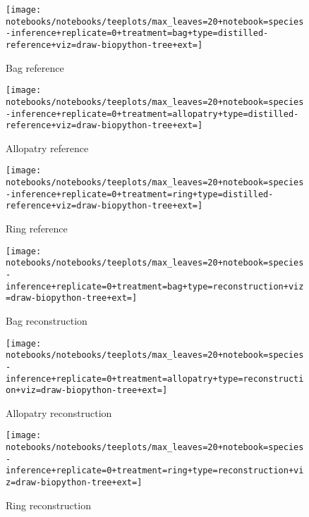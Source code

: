\begin{sidewaysfigure}

  \begin{subfigure}{.33\linewidth}
    \centering
    \texttt{[image: notebooks/notebooks/teeplots/max\_leaves=20+notebook=species-inference+replicate=0+treatment=bag+type=distilled-reference+viz=draw-biopython-tree+ext=]}
    \caption{Bag reference}
    \label{fig:species-example-replicates:bag-reference}
  \end{subfigure}
  \begin{subfigure}{.33\linewidth}
    \centering
    \texttt{[image: notebooks/notebooks/teeplots/max\_leaves=20+notebook=species-inference+replicate=0+treatment=allopatry+type=distilled-reference+viz=draw-biopython-tree+ext=]}
    \caption{Allopatry reference}
    \label{fig:species-example-replicates:allopatry-reference}
  \end{subfigure}
  \begin{subfigure}{.33\linewidth}
    \centering
    \texttt{[image: notebooks/notebooks/teeplots/max\_leaves=20+notebook=species-inference+replicate=0+treatment=ring+type=distilled-reference+viz=draw-biopython-tree+ext=]}
    \caption{Ring reference}
    \label{fig:species-example-replicates:ring-reference}
  \end{subfigure}

  \begin{subfigure}{.33\linewidth}
    \centering
    \texttt{[image: notebooks/notebooks/teeplots/max\_leaves=20+notebook=species-inference+replicate=0+treatment=bag+type=reconstruction+viz=draw-biopython-tree+ext=]}
    \caption{Bag reconstruction}
    \label{fig:species-example-replicates:bag-reconstruction}
  \end{subfigure}
  \begin{subfigure}{.33\linewidth}
    \centering
    \texttt{[image: notebooks/notebooks/teeplots/max\_leaves=20+notebook=species-inference+replicate=0+treatment=allopatry+type=reconstruction+viz=draw-biopython-tree+ext=]}
    \caption{Allopatry reconstruction}
    \label{fig:species-example-replicates:allopatry-reconstruction}
  \end{subfigure}
  \begin{subfigure}{.33\linewidth}
    \centering
    \texttt{[image: notebooks/notebooks/teeplots/max\_leaves=20+notebook=species-inference+replicate=0+treatment=ring+type=reconstruction+viz=draw-biopython-tree+ext=]}
    \caption{Ring reconstruction}
    \label{fig:species-example-replicates:ring-reconstruction}
  \end{subfigure}


\end{sidewaysfigure}
